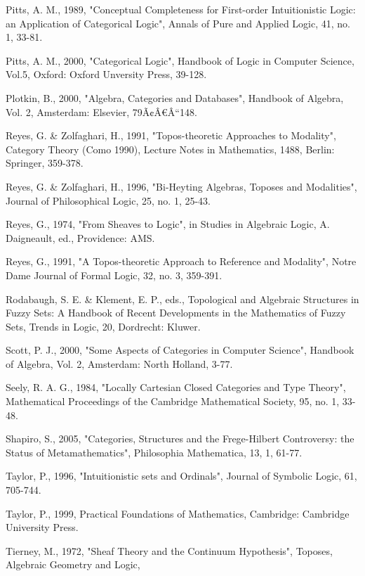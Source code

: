 \documentclass[12pt]{article}
\begin{document}
\begin{thebibliography}{199}
Pitts, A. M., 1989, "Conceptual Completeness for First-order Intuitionistic Logic: an Application of Categorical Logic", Annals of Pure and Applied Logic, 41, no. 1, 33-81. 

Pitts, A. M., 2000, "Categorical Logic", Handbook of Logic in Computer Science, Vol.5, Oxford: Oxford Unversity Press, 39-128.

Plotkin, B., 2000, "Algebra, Categories and Databases", Handbook of Algebra, Vol. 2, Amsterdam: Elsevier, 79Ã¢Â€Â“148. 

Reyes, G. \& Zolfaghari, H., 1991, "Topos-theoretic Approaches to Modality", Category Theory (Como 1990), Lecture Notes in Mathematics, 1488, Berlin: Springer, 359-378. 

Reyes, G. \& Zolfaghari, H., 1996, "Bi-Heyting Algebras, Toposes and Modalities", Journal of Philosophical Logic, 25, no. 1, 25-43. 

Reyes, G., 1974, "From Sheaves to Logic", in Studies in Algebraic Logic, A. Daigneault, ed., Providence: AMS. 

Reyes, G., 1991, "A Topos-theoretic Approach to Reference and Modality", Notre Dame Journal of Formal Logic, 32, no. 3, 359-391.

Rodabaugh, S. E. \& Klement, E. P., eds., Topological and Algebraic Structures in Fuzzy Sets: A Handbook of Recent Developments in the Mathematics of Fuzzy Sets, Trends in Logic, 20, Dordrecht: Kluwer. 

Scott, P. J., 2000, "Some Aspects of Categories in Computer Science", Handbook of Algebra, Vol. 2, Amsterdam: North Holland, 3-77. 

Seely, R. A. G., 1984, "Locally Cartesian Closed Categories and Type Theory", Mathematical Proceedings of the Cambridge Mathematical Society, 95, no. 1, 33-48. 

Shapiro, S., 2005, "Categories, Structures and the Frege-Hilbert Controversy: the Status of Metamathematics", Philosophia Mathematica, 13, 1, 61-77.

Taylor, P., 1996, "Intuitionistic sets and Ordinals", Journal of Symbolic Logic, 61, 705-744.
 
Taylor, P., 1999, Practical Foundations of Mathematics, Cambridge: Cambridge University Press. 

Tierney, M., 1972, "Sheaf Theory and the Continuum Hypothesis", Toposes, Algebraic Geometry and Logic, 


\end{thebibliography}
\end{document}
